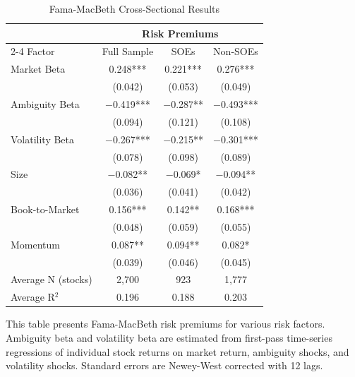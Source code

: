 \documentclass[preprint,12pt,authoryear]{elsarticle}
\begin{document}
\begin{table}[htbp]
\centering
\caption{Fama-MacBeth Cross-Sectional Results}
\label{tab:fama_macbeth}
\begin{threeparttable}
\begin{tabular*}{\textwidth}{@{\extracolsep{\fill}} lccc @{\extracolsep{\fill}}}
\toprule
& \multicolumn{3}{c}{Risk Premiums} \\
\cmidrule(lr){2-4}
Factor & Full Sample & SOEs & Non-SOEs \\
\midrule
\midrule
Market Beta & 0.248*** & 0.221*** & 0.276*** \\
& (0.042) & (0.053) & (0.049) \\
Ambiguity Beta & $-$0.419*** & $-$0.287** & $-$0.493*** \\
& (0.094) & (0.121) & (0.108) \\
Volatility Beta & $-$0.267*** & $-$0.215** & $-$0.301*** \\
& (0.078) & (0.098) & (0.089) \\
Size & $-$0.082** & $-$0.069* & $-$0.094** \\
& (0.036) & (0.041) & (0.042) \\
Book-to-Market & 0.156*** & 0.142** & 0.168*** \\
& (0.048) & (0.059) & (0.055) \\
Momentum & 0.087** & 0.094** & 0.082* \\
& (0.039) & (0.046) & (0.045) \\
\midrule
Average N (stocks) & 2,700 & 923 & 1,777 \\
Average R$^2$ & 0.196 & 0.188 & 0.203 \\
\bottomrule
\end{tabular*}
\begin{tablenotes}[flushleft]
\small
\item[] This table presents Fama-MacBeth risk premiums for various risk factors. Ambiguity beta and volatility beta are estimated from first-pass time-series regressions of individual stock returns on market return, ambiguity shocks, and volatility shocks. Standard errors are Newey-West corrected with 12 lags.
\end{tablenotes}
\end{threeparttable}
\end{table}
\end{document}
